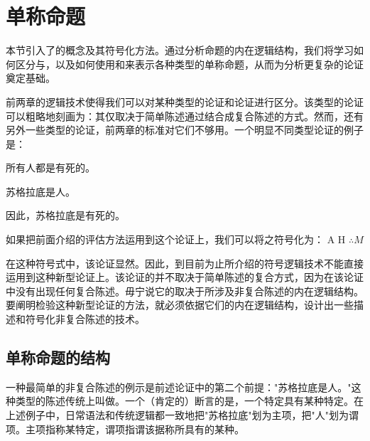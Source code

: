 \section{单称命题}

\begin{logicbox}[title=引言]
本节引入了的概念及其符号化方法。通过分析命题的内在逻辑结构，我们将学习如何区分与，以及如何使用和来表示各种类型的单称命题，从而为分析更复杂的论证奠定基础。
\end{logicbox}

前两章的逻辑技术使得我们可以对某种类型的论证和论证进行区分。该类型的论证可以粗略地刻画为：其仅取决于简单陈述通过结合成复合陈述的方式。然而，还有另外一些类型的论证，前两章的标准对它们不够用。一个明显不同类型论证的例子是：

\begin{examplebox}[title=经典三段论实例]
所有人都是有死的。

苏格拉底是人。

因此，苏格拉底是有死的。
\end{examplebox}

如果把前面介绍的评估方法运用到这个论证上，我们可以将之符号化为：
A
H
$\therefore M$

在这种符号式中，该论证显然。因此，到目前为止所介绍的符号逻辑技术不能直接运用到这种新型论证上。该论证的并不取决于简单陈述的复合方式，因为在该论证中没有出现任何复合陈述。毋宁说它的取决于所涉及非复合陈述的内在逻辑结构。要阐明检验这种新型论证的方法，就必须依据它们的内在逻辑结构，设计出一些描述和符号化非复合陈述的技术。

\subsection{单称命题的结构}

\begin{theorembox}[title=单称命题的定义]
一种最简单的非复合陈述的例示是前述论证中的第二个前提："苏格拉底是人。"这种类型的陈述传统上叫做。一个（肯定的）断言的是，一个特定具有某种特定。在上述例子中，日常语法和传统逻辑都一致地把"苏格拉底"划为主项，把"人"划为谓项。主项指称某特定，谓项指谓该据称所具有的某种。
\end{theorembox}

